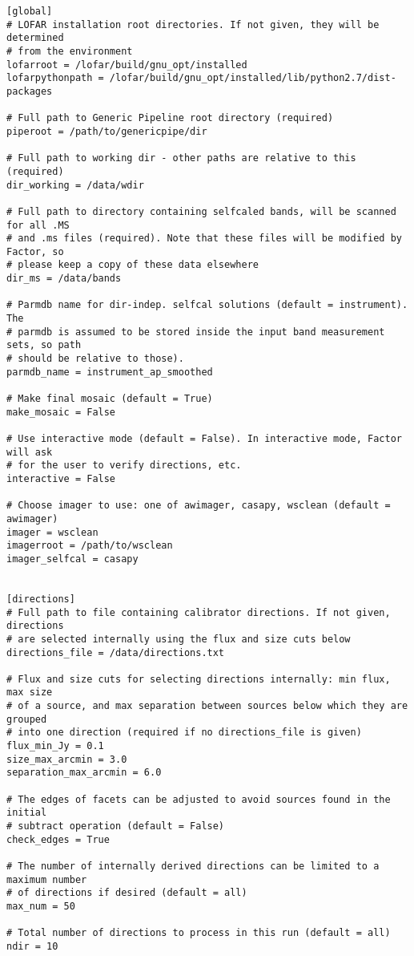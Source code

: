\documentclass[structabstract]{article}
\begin{document}
\begin{verbatim}
[global]
# LOFAR installation root directories. If not given, they will be determined
# from the environment
lofarroot = /lofar/build/gnu_opt/installed
lofarpythonpath = /lofar/build/gnu_opt/installed/lib/python2.7/dist-packages

# Full path to Generic Pipeline root directory (required)
piperoot = /path/to/genericpipe/dir

# Full path to working dir - other paths are relative to this (required)
dir_working = /data/wdir

# Full path to directory containing selfcaled bands, will be scanned for all .MS
# and .ms files (required). Note that these files will be modified by Factor, so
# please keep a copy of these data elsewhere
dir_ms = /data/bands

# Parmdb name for dir-indep. selfcal solutions (default = instrument). The
# parmdb is assumed to be stored inside the input band measurement sets, so path
# should be relative to those).
parmdb_name = instrument_ap_smoothed

# Make final mosaic (default = True)
make_mosaic = False

# Use interactive mode (default = False). In interactive mode, Factor will ask
# for the user to verify directions, etc.
interactive = False

# Choose imager to use: one of awimager, casapy, wsclean (default = awimager)
imager = wsclean
imagerroot = /path/to/wsclean
imager_selfcal = casapy


[directions]
# Full path to file containing calibrator directions. If not given, directions
# are selected internally using the flux and size cuts below
directions_file = /data/directions.txt

# Flux and size cuts for selecting directions internally: min flux, max size
# of a source, and max separation between sources below which they are grouped
# into one direction (required if no directions_file is given)
flux_min_Jy = 0.1
size_max_arcmin = 3.0
separation_max_arcmin = 6.0

# The edges of facets can be adjusted to avoid sources found in the initial
# subtract operation (default = False)
check_edges = True

# The number of internally derived directions can be limited to a maximum number
# of directions if desired (default = all)
max_num = 50

# Total number of directions to process in this run (default = all)
ndir = 10


\end{verbatim}
\end{document}
